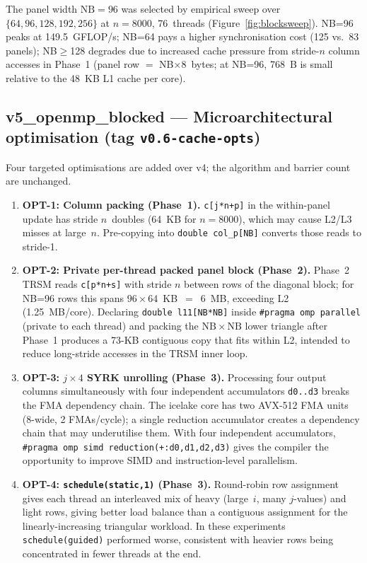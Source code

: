 \documentclass{article}
\begin{document}
The panel width $\mathrm{NB}=96$ was selected by empirical sweep over
$\{64,96,128,192,256\}$ at $n=8000$, 76~threads (Figure~\ref{fig:blocksweep}).
NB=96 peaks at 149.5~GFLOP/s; NB=64 pays a higher synchronisation cost
(125 vs.\ 83 panels); NB$\geq$128 degrades due to increased cache pressure
from stride-$n$ column accesses in Phase~1 (panel row $=$ NB$\times$8~bytes;
at NB=96, 768~B is small relative to the 48~KB L1 cache per core).

\subsection{v5\_openmp\_blocked --- Microarchitectural optimisation (tag \texttt{v0.6-cache-opts})}

Four targeted optimisations are added over v4; the algorithm and barrier count
are unchanged.

\begin{enumerate}
  \item \textbf{OPT-1: Column packing (Phase~1).}
    \texttt{c[j*n+p]} in the within-panel update has stride $n$~doubles
    (64~KB for $n=8000$), which may cause L2/L3 misses at large~$n$.
    Pre-copying into \texttt{double col\_p[NB]} converts those reads to stride-1.

  \item \textbf{OPT-2: Private per-thread packed panel block (Phase~2).}
    Phase~2 TRSM reads \texttt{c[p*n+s]} with stride $n$ between rows of the
    diagonal block; for NB=96 rows this spans $96\times64$~KB~$=$~6~MB, exceeding
    L2 (1.25~MB/core).
    Declaring \texttt{double l11[NB*NB]} inside \texttt{\#pragma~omp~parallel}
    (private to each thread) and packing the $\mathrm{NB}\times\mathrm{NB}$
    lower triangle after Phase~1 produces a 73-KB contiguous copy that fits
    within L2, intended to reduce long-stride accesses in the TRSM inner loop.

  \item \textbf{OPT-3: $j{\times}4$ SYRK unrolling (Phase~3).}
    Processing four output columns simultaneously with four independent
    accumulators \texttt{d0..d3} breaks the FMA dependency chain.
    The icelake core has two AVX-512 FMA units (8-wide, 2 FMAs/cycle); a single
    reduction accumulator creates a dependency chain that may underutilise them.
    With four independent accumulators, \texttt{\#pragma~omp~simd~reduction(+:d0,d1,d2,d3)}
    gives the compiler the opportunity to improve SIMD and instruction-level
    parallelism.

  \item \textbf{OPT-4: \texttt{schedule(static,1)} (Phase~3).}
    Round-robin row assignment gives each thread an interleaved mix of heavy
    (large~$i$, many $j$-values) and light rows, giving better load balance
    than a contiguous assignment for the linearly-increasing triangular workload.
    In these experiments \texttt{schedule(guided)} performed worse, consistent
    with heavier rows being concentrated in fewer threads at the end.
\end{enumerate}
\end{document}
